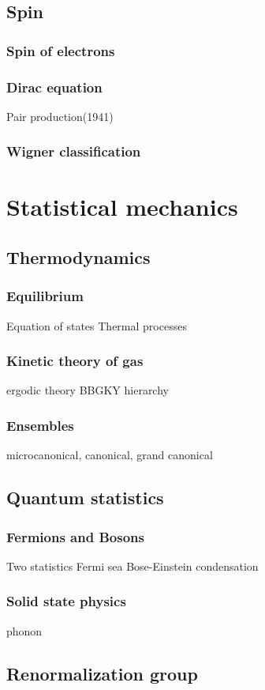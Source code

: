 \documentclass{../note}
\begin{document}
\chapter{Spin}
\section{Spin of electrons}
\section{Dirac equation}
Pair production(1941)
\section{Wigner classification}



\part{Statistical mechanics}
\chapter{Thermodynamics}
\section{Equilibrium}
Equation of states
Thermal processes
\section{Kinetic theory of gas}
ergodic theory
BBGKY hierarchy
\section{Ensembles}
microcanonical, canonical, grand canonical

\chapter{Quantum statistics}
\section{Fermions and Bosons}
Two statistics
Fermi sea
Bose-Einstein condensation
\section{Solid state physics}
phonon

\chapter{Renormalization group}
\end{document}
